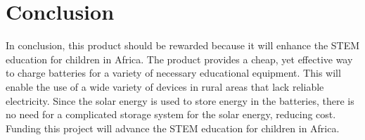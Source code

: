 \documentclass[letterpaper, 11pt]{article}
\begin{document}
\section*{Conclusion}
In conclusion, this product should be rewarded because it will enhance the STEM education for children in Africa.  The product provides a cheap, yet effective way to charge batteries for a variety of necessary educational equipment.  This will enable the use of a wide variety of devices in rural areas that lack reliable electricity.  Since the solar energy is used to store energy in the batteries, there is no need for a complicated storage system for the solar energy, reducing cost.  Funding this project will advance the STEM education for children in Africa.
\end{document}
